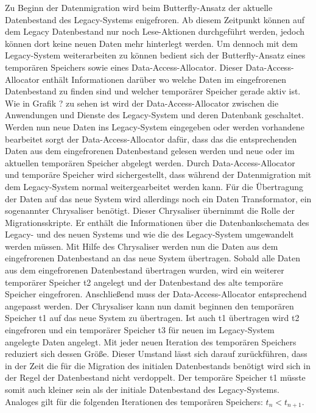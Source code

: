 Zu Beginn der Datenmigration wird beim Butterfly-Ansatz der aktuelle Datenbestand des Legacy-Systems enigefroren. Ab diesem Zeitpunkt können auf dem Legacy Datenbestand nur noch Lese-Aktionen durchgeführt werden, jedoch können dort keine neuen Daten mehr hinterlegt werden.\citep[S. 202]{wuLawlessBisbal-1997} Um dennoch mit dem Legacy-System weiterarbeiten zu können bedient sich der Butterfly-Ansatz eines temporären Speichers sowie eines Data-Access-Allocator. Dieser Data-Access-Allocator enthält Informationen darüber wo welche Daten im eingefrorenen Datenbestand zu finden sind und welcher temporärer Speicher gerade aktiv ist.\citep[S. 202]{wuLawlessBisbal-1997} Wie in Grafik ? zu sehen ist wird der Data-Access-Allocator zwischen die Anwendungen und Dienste des Legacy-System und deren Datenbank geschaltet. Werden nun neue Daten ins Legacy-System eingegeben oder werden vorhandene bearbeitet sorgt der Data-Access-Allocator dafür, dass das die entsprechenden Daten aus dem eingefrorenen Datenbestand gelesen werden und neue oder im aktuellen temporären Speicher abgelegt werden.\citep[S. 202]{wuLawlessBisbal-1997}
\lb
Durch Data-Access-Allocator und temporäre Speicher wird sichergestellt, dass während der Datenmigration mit dem Legacy-System normal weitergearbeitet werden kann. Für die Übertragung der Daten auf das neue System wird allerdings noch ein Daten Transformator, ein sogenannter Chrysaliser benötigt.\citep[S. 202]{wuLawlessBisbal-1997} Dieser Chrysaliser übernimmt die Rolle der Migrationsskripte. Er enthält die Informationen über die Datenbankschemata des Legacy- und des neuen Systems und wie die des Legacy-System umgewandelt werden müssen.\citep[S.202]{wuLawlessBisbal-1997} 
\lb
Mit Hilfe des Chrysaliser werden nun die Daten aus dem eingefrorenen Datenbestand an das neue System übertragen. Sobald alle Daten aus dem eingefrorenen Datenbestand übertragen wurden, wird ein weiterer temporärer Speicher t2 angelegt und der Datenbestand des alte temporäre Speicher eingefroren. Anschließend muss der Data-Access-Allocator entsprechend angepasst werden.\citep[S. 202]{wuLawlessBisbal-1997} Der Chrysaliser kann nun damit beginnen den temporären Speicher t1 auf das neue System zu übertragen. Ist auch t1 übertragen wird t2 eingefroren und ein temporärer Speicher t3 für neuen im Legacy-System angelegte Daten angelegt.\citep[S. 202]{wuLawlessBisbal-1997} Mit jeder neuen Iteration des temporären Speichers reduziert sich dessen Größe. Dieser Umstand lässt sich darauf zurückführen, dass in der Zeit die für die Migration des initialen Datenbestands benötigt wird sich in der Regel der Datenbestand nicht verdoppelt. Der temporäre Speicher t1 müsste somit auch kleiner sein als der initiale Datenbestand des Legacy-Systems. Analoges gilt für die folgenden Iterationen des temporären Speichers: \textbf{$t_n <t_{n+1}$}.\citep[S. 202]{wuLawlessBisbal-1997} 

